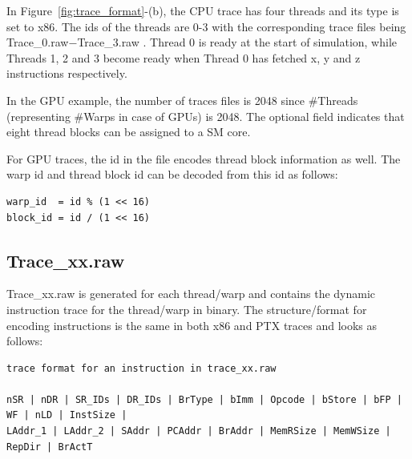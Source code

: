 
In Figure~\ref{fig:trace_format}-(b), the CPU trace has four threads and its
type is set to x86. The ids of the threads are 0-3 with the corresponding trace
files being Trace\_0.raw$-$Trace\_3.raw . Thread 0 is ready at the start of
simulation, while Threads 1, 2 and 3 become ready when Thread 0 has fetched x,
  y and z instructions respectively.


In the GPU example, the number of traces files is 2048 since \#Threads
(representing \#Warps in case of GPUs) is 2048.  The optional field indicates
that eight thread blocks can be assigned to a SM core. 

For GPU traces, the id in the file encodes thread block information as
well. The warp id and thread block id can be decoded from this id as follows:

\begin{Verbatim}
warp_id  = id % (1 << 16)
block_id = id / (1 << 16)
\end{Verbatim}


\subsection{Trace\_xx.raw}

Trace\_xx.raw is generated for each thread/warp and contains the dynamic
instruction trace for the thread/warp in binary. The structure/format for
encoding instructions is the same in both x86 and PTX traces and looks as
follows:


\begin{Verbatim}
trace format for an instruction in trace_xx.raw

nSR | nDR | SR_IDs | DR_IDs | BrType | bImm | Opcode | bStore | bFP | WF | nLD | InstSize |
LAddr_1 | LAddr_2 | SAddr | PCAddr | BrAddr | MemRSize | MemWSize | RepDir | BrActT 
\end{Verbatim}



